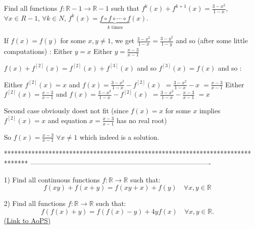 \begin{solution}
	\begin{tcolorbox}Find all functions $f: \mathbb{R}-{1}\to\mathbb{R}-{1}$ such that $f^{k}(x)+f^{k+1}(x)=\frac{3-x^2}{1-x}$, $\forall x{\in}R-{1}$, $\forall k{{\in}N}$, $f^{k}(x)= \underbrace{f{\circ}f{\circ}\cdots{\circ}f}_{k\textrm{ times}}(x)$.\end{tcolorbox}
If $f(x)=f(y)$ for some $x,y\ne 1$, we get $\frac{3-x^2}{1-x}=\frac{3-y^2}{1-y}$ and so (after some little computations) :
Either $y=x$
Either $y=\frac{x-3}{x-1}$

$f(x)+f^{[2]}(x)=f^{[2]}(x)+f^{[3]}(x)$ and so $f^{[3]}(x)=f(x)$ and so :

Either $f^{[2]}(x)=x$ and $f(x)=\frac{3-x^2}{1-x}-f^{[2]}(x)$ $=\frac{3-x^2}{1-x}-x$ $=\frac{x-3}{x-1}$
Either $f^{[2]}(x)=\frac{x-3}{x-1}$ and $f(x)=\frac{3-x^2}{1-x}-f^{[2]}(x)$ $=\frac{3-x^2}{1-x}-\frac{x-3}{x-1}$ $=x$

Second case obviously doest not fit (since $f(x)=x$ for some $x$ implies $f^{[2]}(x)=x$ and equation $x=\frac{x-3}{x-1}$ has no real root)

So $\boxed{f(x)=\frac{x-3}{x-1}}$ $\forall x\ne 1$ which indeed is a solution.
\end{solution}
*******************************************************************************
-------------------------------------------------------------------------------

\begin{problem}
	1) Find all continuous functions $f:\mathbb{R}\to \mathbb{R}$ such that:
\[f(xy)+f(x+y)=f(xy+x)+f(y)\quad \forall x,y\in \mathbb{R}\]

2) Find all  functions $f:\mathbb{R}\to \mathbb{R}$ such that:
\[f(f(x)+y)=f(f(x)-y)+4yf(x)\quad  \forall x,y \in \mathbb{R}.\]
	\flushright \href{https://artofproblemsolving.com/community/c6h567455}{(Link to AoPS)}
\end{problem}



